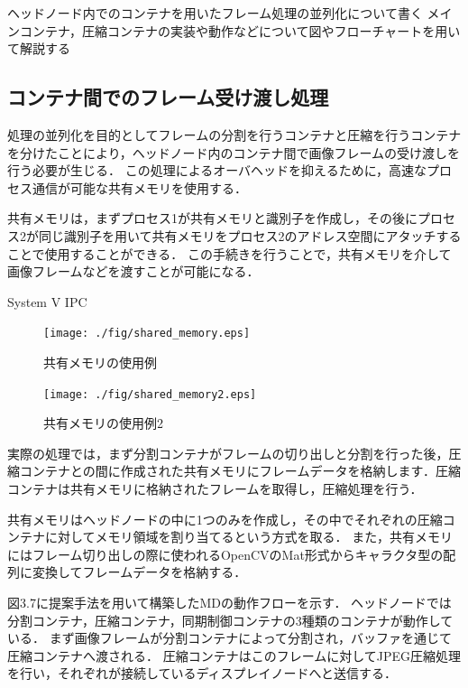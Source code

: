 ヘッドノード内でのコンテナを用いたフレーム処理の並列化について書く
メインコンテナ，圧縮コンテナの実装や動作などについて図やフローチャートを用いて解説する

\subsection*{コンテナ間でのフレーム受け渡し処理}

処理の並列化を目的としてフレームの分割を行うコンテナと圧縮を行うコンテナを分けたことにより，ヘッドノード内のコンテナ間で画像フレームの受け渡しを行う必要が生じる．
この処理によるオーバヘッドを抑えるために，高速なプロセス通信が可能な共有メモリを使用する．

共有メモリは，まずプロセス1が共有メモリと識別子を作成し，その後にプロセス2が同じ識別子を用いて共有メモリをプロセス2のアドレス空間にアタッチすることで使用することができる．
この手続きを行うことで，共有メモリを介して画像フレームなどを渡すことが可能になる．

System V IPC \cite{kerrisk2010linux,linux_kernel}
\begin{figure}[H]
    \hspace*{\fill}
    \texttt{[image: ./fig/shared\_memory.eps]}
    \hspace*{\fill}
    \caption{共有メモリの使用例}
\end{figure}

\begin{figure}[H]
    \hspace*{\fill}
    \texttt{[image: ./fig/shared\_memory2.eps]}
    \hspace*{\fill}
    \caption{共有メモリの使用例2}
\end{figure}

実際の処理では，まず分割コンテナがフレームの切り出しと分割を行った後，圧縮コンテナとの間に作成された共有メモリにフレームデータを格納します．圧縮コンテナは共有メモリに格納されたフレームを取得し，圧縮処理を行う．

共有メモリはヘッドノードの中に1つのみを作成し，その中でそれぞれの圧縮コンテナに対してメモリ領域を割り当てるという方式を取る．
また，共有メモリにはフレーム切り出しの際に使われるOpenCVのMat形式からキャラクタ型の配列に変換してフレームデータを格納する．


図3.7に提案手法を用いて構築したMDの動作フローを示す．
ヘッドノードでは分割コンテナ，圧縮コンテナ，同期制御コンテナの3種類のコンテナが動作している．
まず画像フレームが分割コンテナによって分割され，バッファを通じて圧縮コンテナへ渡される．
圧縮コンテナはこのフレームに対してJPEG圧縮処理を行い，それぞれが接続しているディスプレイノードへと送信する．

